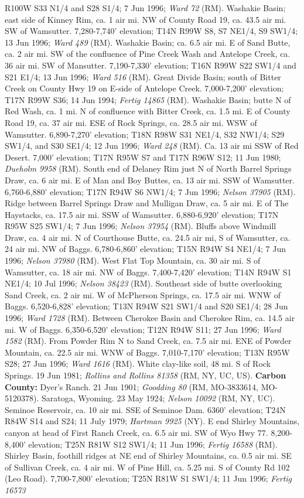 R100W S33 N1/4 and S28 S1/4; 7 Jun 1996; \textit{Ward 72} (RM).  Washakie Basin; east side of Kinney Rim, ca. 1 air mi. NW of County Road 19, ca. 43.5 air mi. SW of Wamsutter. 7,280-7,740' elevation; T14N R99W S8, S7 NE1/4, S9 SW1/4; 13 Jun 1996; \textit{Ward 489} (RM).  Washakie Basin; ca. 6.5 air mi. E of Sand Butte, ca. 2 air mi. SW of the confluence of Pine Creek Wash and Antelope Creek, ca. 36 air mi. SW of Mansutter. 7,190-7,330' elevation; T16N R99W S22 SW1/4 and S21 E1/4; 13 Jun 1996; \textit{Ward 516} (RM).  Great Divide Basin; south of Bitter Creek on County Hwy 19 on E-side of Antelope Creek. 7,000-7,200' elevation; T17N R99W S36; 14 Jun 1994; \textit{Fertig 14865} (RM).  Washakie Basin; butte N of Red Wash, ca. 1 mi. N of confluence with Bitter Creek, ca. 1.5 mi. E of County Road 19, ca. 37 air mi. ESE of Rock Springs, ca. 28.5 air mi. WSW of Wamsutter. 6,890-7,270' elevation; T18N R98W S31 NE1/4, S32 NW1/4; S29 SW1/4, and S30 SE1/4; 12 Jun 1996; \textit{Ward 248} (RM).  Ca. 13 air mi SSW of Red Desert. 7,000' elevation; T17N R95W S7 and T17N R96W S12; 11 Jun 1980; \textit{Dueholm 9958} (RM). South end of Delaney Rim just N of North Barrel Springs Draw, ca. 6 air mi. E of Man and Boy Buttes, ca. 13 air mi. SSW of Wamsutter. 6,760-6,880' elevation; T17N R94W S6 NW1/4; 7 Jun 1996; \textit{Nelson 37905} (RM).  Ridge between Barrel Springs Draw and Mulligan Draw, ca. 5 air mi. E of The Haystacks, ca. 17.5 air mi. SSW of Wamsutter. 6,880-6,920' elevation; T17N R95W S25 SW1/4; 7 Jun 1996; \textit{Nelson 37954} (RM).  Bluffs above Windmill Draw, ca. 4 air mi. N of Courthouse Butte, ca. 24.5 air mi, S of Wamsutter, ca. 24 air mi. NW of Baggs. 6,780-6,860' elevation; T15N R94W S4 NE1/4; 7 Jun 1996; \textit{Nelson 37980} (RM).  West Flat Top Mountain, ca. 30 air mi. S of Wamsutter, ca. 18 air mi. NW of Baggs. 7,400-7,420' elevation; T14N R94W S1 NE1/4; 10 Jul 1996; \textit{Nelson 38423} (RM).  Southeast side of butte overlooking Sand Creek, ca. 2 air mi. W of McPherson Springs, ca. 17.5 air mi. WNW of Baggs. 6,520-6,828' elevation; T13N R94W S21 SW1/4 and S20 SE1/4; 28 Jun 1996; \textit{Ward	1728} (RM).  Between Cherokee Basin and Cherokee Rim, ca. 14.5 air mi. W of Baggs. 6,350-6,520' elevation; T12N R94W S11; 27 Jun 1996; \textit{Ward 1582} (RM).  From Powder Rim N to Sand Creek, ca. 7.5 air mi. ENE of Powder Mountain, ca. 22.5 air mi. WNW of Baggs. 7,010-7,170' elevation; T13N R95W S28; 27 Jun 1996; \textit{Ward 1616} (RM).  White clay-like soil, 48 mi. S of Rock Springs. 19 Jun 1981; \textit{Rollins and Rollins 81358} (RM, NY, UC, US).  \textbf{Carbon County:} Dyer’s Ranch. 21 Jun 1901; \textit{Goodding 80} (RM, MO-3833614, MO-5120378).  Saratoga, Wyoming. 23 May 1924; \textit{Nelson 10092} (RM, NY, UC).  Seminoe Reservoir, ca. 10 air mi. SSE of Seminoe Dam. 6360’ elevation; T24N R84W S14 and S24; 11 July 1979; \textit{Hartman 9925} (NY).  E end Shirley Mountains, canyon at head of First Ranch Creek, ca. 6.5 air mi. SW of Wyo Hwy 77. 8,200-8,400’ elevation; T25N R81W S12 SW1/4; 11 Jun 1996; \textit{Fertig 16588} (RM). Shirley Basin, foothill ridges at NE end of Shirley Mountains, ca. 0.5 air mi. SE of Sullivan Creek, ca. 4 air mi. W of Pine Hill, ca. 5.25 mi. S of County Rd 102 (Leo Road). 7,700-7,800’ elevation; T25N R81W S1 SW1/4; 11 Jun 1996; \textit{Fertig 16573} 